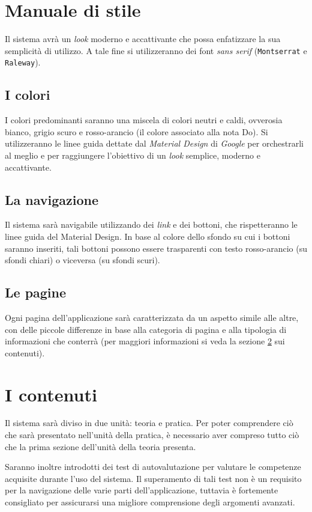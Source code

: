\section{Manuale di stile}
Il sistema avrà un \emph{look} moderno e accattivante che possa enfatizzare la sua semplicità di utilizzo. A tale fine si utilizzeranno dei font \emph{sans serif} (\texttt{Montserrat} e \texttt{Raleway}).

\subsection{I colori}
I colori predominanti saranno una miscela di colori neutri e caldi, ovverosia bianco, grigio scuro e rosso-arancio (il colore associato alla nota Do). Si utilizzeranno le linee guida dettate dal \emph{Material Design} di \emph{Google} per orchestrarli al meglio e per raggiungere l'obiettivo di un \emph{look} semplice, moderno e accattivante.

\subsection{La navigazione}
Il sistema sarà navigabile utilizzando dei \emph{link} e dei bottoni, che rispetteranno le linee guida del Material Design. In base al colore dello sfondo su cui i bottoni saranno inseriti, tali bottoni possono essere trasparenti con testo rosso-arancio (su sfondi chiari) o viceversa (su sfondi scuri).

\subsection{Le pagine} 
Ogni pagina dell'applicazione sarà caratterizzata da un aspetto simile alle altre, con delle piccole differenze in base alla categoria di pagina e alla tipologia di informazioni che conterrà (per maggiori informazioni si veda la sezione \ref{sec:contenuti} sui contenuti).

\section{I contenuti}\label{sec:contenuti}
Il sistema sarà diviso in due unità: teoria e pratica. Per poter comprendere ciò che sarà presentato nell'unità della pratica, è necessario aver compreso tutto ciò che la prima sezione dell'unità della teoria presenta.

Saranno inoltre introdotti dei test di autovalutazione per valutare le competenze acquisite durante l'uso del sistema. Il superamento di tali test non è un requisito per la navigazione delle varie parti dell'applicazione, tuttavia è fortemente consigliato per assicurarsi una migliore comprensione degli argomenti avanzati.

